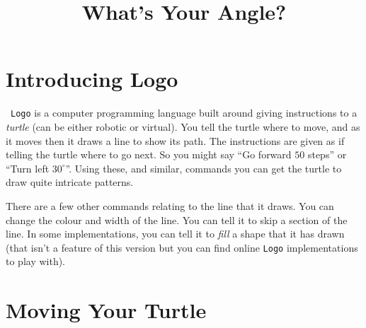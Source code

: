 \documentclass[
  xhtml,%
  use filename%
]{internet}
\title{What's Your Angle?}
\begin{document}
\maketitle
\section{Introducing Logo}

\ \verb+Logo+ is a computer programming language built around giving instructions to a \emph{turtle} (can be either robotic or virtual).
You tell the turtle where to move, and as it moves then it draws a line to show its path.
The instructions are given as if telling the turtle where to go next.
So you might say ``Go forward \(50\) steps'' or ``Turn left \(30^\circ\)''.
Using these, and similar, commands you can get the turtle to draw quite intricate patterns.

There are a few other commands relating to the line that it draws.
You can change the colour and width of the line.
You can tell it to skip a section of the line.
In some implementations, you can tell it to \emph{fill} a shape that it has drawn (that isn't a feature of this version but you can find online \verb+Logo+ implementations to play with).

\section{Moving Your Turtle}
\end{document}
